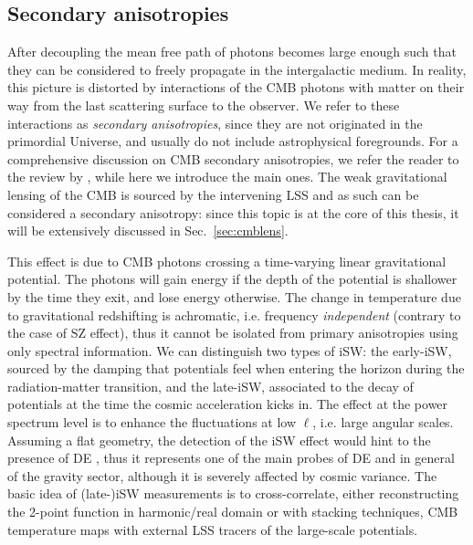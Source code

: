 \subsection{Secondary anisotropies}
\label{sec:cmb_secanip}
After decoupling the mean free path of photons becomes large enough such that they can be 
considered to freely propagate in the intergalactic medium. In reality, this picture is distorted by 
interactions of the \gls{CMB} photons with matter on their way from the last scattering surface to the observer. We refer to these interactions as \emph{secondary anisotropies}, since they are not originated in the primordial Universe, and usually do not include astrophysical foregrounds. For a comprehensive discussion on \gls{CMB} secondary 
anisotropies, we refer the reader to the review by \citet{Aghanim2008}, while here we introduce the main ones. The weak gravitational lensing of the \gls{CMB} is sourced by the intervening \gls{LSS} and as such can be considered a secondary anisotropy: since this topic is at the core of this thesis, it will be extensively discussed in Sec.~\eqref{sec:cmblens}.

This effect is due to \gls{CMB} photons crossing a time-varying linear gravitational potential. 
The  photons 
will gain energy if the depth of the potential is shallower by the time they exit, and lose energy otherwise.
The change in temperature due to gravitational redshifting is achromatic, i.e. frequency \emph{independent} (contrary to the case of \gls{SZ} effect), thus it cannot be isolated from primary 
anisotropies using only spectral information. We can distinguish two types of \gls{iSW}: the early-\gls{iSW}, 
sourced by the damping that potentials feel when entering the horizon during the radiation-matter 
transition, and the
late-\gls{iSW}, associated to the decay of potentials at the time the cosmic acceleration kicks in. The effect at the power spectrum level is to enhance the fluctuations at low $\ell$, i.e. large angular scales. 
Assuming a flat geometry, the detection of the \gls{iSW} effect would hint to the presence of \gls{DE} 
\citep{Crittenden1996}, thus it represents one of the main probes of \gls{DE} and in general of the gravity sector, although
it is severely affected by cosmic variance. The basic idea of (late-)\gls{iSW} measurements is to 
cross-correlate, either reconstructing the 2-point function in harmonic/real domain or with stacking techniques, \gls{CMB} temperature maps with external \gls{LSS} tracers of the large-scale potentials.

